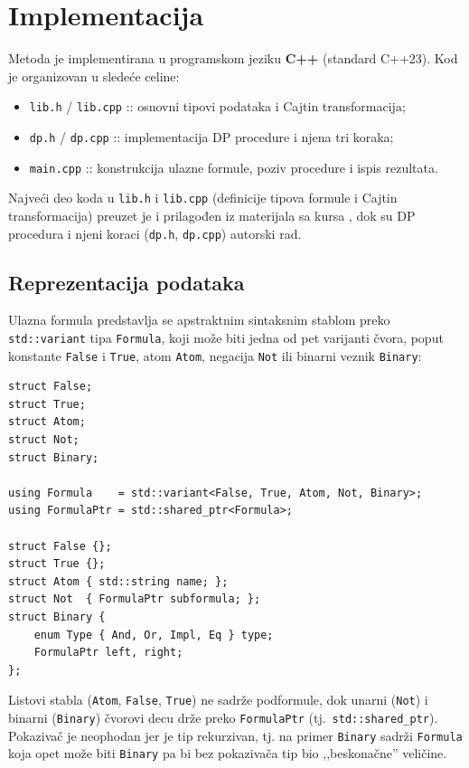 \documentclass[a4paper,10pt]{article}
\begin{document}
\section{Implementacija}
\label{sec:implementacija}

Metoda je implementirana u programskom jeziku \textbf{C++} (standard C++23).
Kod je organizovan u sledeće celine:

\begin{itemize}
  \item \verb|lib.h| / \verb|lib.cpp| :: osnovni tipovi podataka i Cajtin transformacija;
  \item \verb|dp.h| / \verb|dp.cpp| :: implementacija DP procedure i njena tri koraka;
  \item \verb|main.cpp| :: konstrukcija ulazne formule, poziv procedure i ispis rezultata.
\end{itemize}

Najveći deo koda u \verb|lib.h| i \verb|lib.cpp| (definicije tipova formule i Cajtin transformacija) preuzet je i prilagođen iz materijala sa kursa \cite{ar_materijali}, dok su DP procedura i njeni koraci (\verb|dp.h|, \verb|dp.cpp|) autorski rad.

\subsection{Reprezentacija podataka}

Ulazna formula predstavlja se apstraktnim sintaksnim stablom preko
\verb|std::variant| tipa \verb|Formula|, koji može biti jedna od pet varijanti čvora, poput konstante \verb|False| i \verb|True|, atom
\verb|Atom|, negacija \verb|Not| ili binarni veznik \verb|Binary|:

\begin{lstlisting}
struct False;
struct True;
struct Atom;
struct Not;
struct Binary;

using Formula    = std::variant<False, True, Atom, Not, Binary>;
using FormulaPtr = std::shared_ptr<Formula>;

struct False {};
struct True {};
struct Atom { std::string name; };
struct Not  { FormulaPtr subformula; };
struct Binary {
    enum Type { And, Or, Impl, Eq } type;
    FormulaPtr left, right;
};
\end{lstlisting}

\noindent Listovi stabla (\verb|Atom|, \verb|False|, \verb|True|) ne
sadrže podformule, dok unarni (\verb|Not|) i binarni (\verb|Binary|)
čvorovi decu drže preko \verb|FormulaPtr| (tj.\ \verb|std::shared_ptr|).
Pokazivač je neophodan jer je tip rekurzivan, tj. na primer \verb|Binary| sadrži
\verb|Formula| koja opet može biti \verb|Binary| pa bi bez pokazivača tip bio ,,beskonačne'' veličine.
\end{document}
